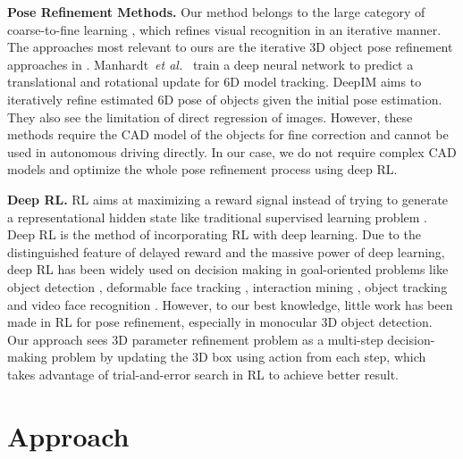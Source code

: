 \documentclass[runningheads]{llncs}
\begin{document}
\noindent
\textbf{Pose Refinement Methods.}
Our method belongs to the large category of coarse-to-fine learning \cite{cao2015look,yoo2015attentionnet,yu2018recurrent}, which refines visual recognition in an iterative manner. The approaches most relevant to ours are the iterative 3D object pose refinement approaches in \cite{manhardt2018deep,li2018deepim}. Manhardt~\emph{et al.}~\cite{manhardt2018deep} train a deep neural network to predict a translational and rotational update for 6D model tracking. DeepIM \cite{li2018deepim} aims to iteratively refine estimated 6D pose of objects given the initial pose estimation. They also see the limitation of direct regression of images. However, these methods require the CAD model of the objects for fine correction and cannot be used in autonomous driving directly. In our case, we do not require complex CAD models and optimize the whole pose refinement process using deep RL.

\noindent
\textbf{Deep RL.}
RL aims at maximizing a reward signal instead of trying to generate a representational hidden state like traditional supervised learning problem \cite{littman2015reinforcement,mnih2015human,sutton2018reinforcement}.
Deep RL is the method of incorporating RL with deep learning. Due to the distinguished feature of delayed reward and the massive power of deep learning, deep RL has been widely used on decision making in goal-oriented problems like object detection \cite{caicedo2015active,mathe2016reinforcement}, deformable face tracking \cite{guo2018dual}, interaction mining \cite{duan2018graphbit}, object tracking \cite{yun2017action,ren2018deep} and video face recognition \cite{rao2017attention}. However, to our best knowledge, little work has been made in RL for pose refinement, especially in monocular 3D object detection. Our approach sees 3D parameter refinement problem as a multi-step decision-making problem by updating the 3D box using action from each step, which takes advantage of trial-and-error search in RL to achieve better result.

\section{Approach}
\end{document}
